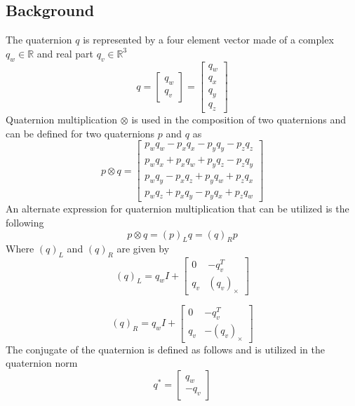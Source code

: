 \subsection{Background}
The quaternion $q$ is represented by a four element vector made of a complex $q_w \in \mathbb{R}$ and real part $q_v \in \mathbb{R}^3$
\begin{equation}
       q =  \begin{bmatrix}
                q_w \\
                q_v
            \end{bmatrix} 
            = \begin{bmatrix}
                q_w \\
                q_x \\
                q_y \\
                q_z
            \end{bmatrix} 
\label{eq: quaternion vector}
\end{equation}
Quaternion multiplication $\otimes$ is used in the composition of two quaternions and can be defined for two quaternions $p$ and $q$ \cite{Quaternion_Kinematics_for_the_Error-state_EKF} as
\begin{equation}
       p \otimes q=\left[\begin{array}{l}p_w q_w-p_x q_x-p_y q_y-p_z q_z \\ p_w q_x+p_x q_w+p_y q_z-p_z q_y \\ p_w q_y-p_x q_z+p_y q_w+p_z q_x \\ p_w q_z+p_x q_y-p_y q_x+p_z q_w\end{array}\right]
\label{eq: quaternion multiplication}
\end{equation}
An alternate expression for quaternion multiplication that can be utilized is the following \cite{Quaternion_Kinematics_for_the_Error-state_EKF}
\begin{equation}
    p \otimes q = (p)_L q = (q)_R p
    \label{eq: alt q mult}
\end{equation}
Where $(q)_L$ and $(q)_R$ are given by 
\begin{equation}
    (q)_L = q_w I + \begin{bmatrix}
        0 & -q_v^T \\
        q_v & (q_v)_{\times}
    \end{bmatrix}
    \label{eq: (q)_L matrix}
\end{equation}

\begin{equation}
    (q)_R = q_w I + \begin{bmatrix}
        0 & -q_v^T \\
        q_v & -(q_v)_{\times}
    \end{bmatrix}
    \label{eq: (q)_R matrix}
\end{equation}
The conjugate of the quaternion is defined as follows and is utilized in the quaternion norm
\begin{equation}
    q^* = \begin{bmatrix}
                q_w \\
                -q_v
            \end{bmatrix} 
    \label{eq: quaterion conjugate}
\end{equation}

